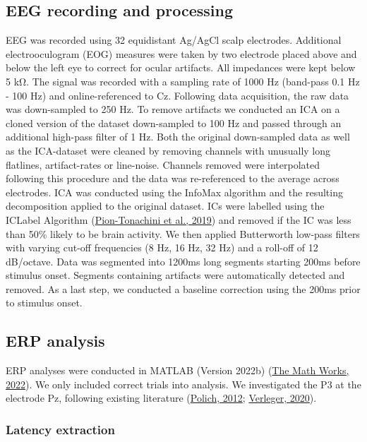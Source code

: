 \documentclass[
  man]{apa7}
\begin{document}
\hypertarget{eeg-recording-and-processing}{%
\subsection{EEG recording and processing}\label{eeg-recording-and-processing}}

EEG was recorded using 32 equidistant Ag/AgCl scalp electrodes. Additional electrooculogram (EOG) measures were taken by two electrode placed above and below the left eye to correct for ocular artifacts. All impedances were kept below 5 kΩ. The signal was recorded with a sampling rate of 1000 Hz (band-pass 0.1 Hz - 100 Hz) and online-referenced to Cz. Following data acquisition, the raw data was down-sampled to 250 Hz. To remove artifacts we conducted an ICA on a cloned version of the dataset down-sampled to 100 Hz and passed through an additional high-pass filter of 1 Hz. Both the original down-sampled data as well as the ICA-dataset were cleaned by removing channels with unusually long flatlines, artifact-rates or line-noise. Channels removed were interpolated following this procedure and the data was re-referenced to the average across electrodes. ICA was conducted using the InfoMax algorithm and the resulting decomposition applied to the original dataset. ICs were labelled using the ICLabel Algorithm (\protect\hyperlink{ref-pion2019iclabel}{Pion-Tonachini et al., 2019}) and removed if the IC was less than 50\% likely to be brain activity. We then applied Butterworth low-pass filters with varying cut-off frequencies (8 Hz, 16 Hz, 32 Hz) and a roll-off of 12 dB/octave. Data was segmented into 1200ms long segments starting 200ms before stimulus onset. Segments containing artifacts were automatically detected and removed. As a last step, we conducted a baseline correction using the 200ms prior to stimulus onset.

\hypertarget{erp-analysis}{%
\subsection{ERP analysis}\label{erp-analysis}}

ERP analyses were conducted in MATLAB (Version 2022b) (\protect\hyperlink{ref-matlab2022b}{The Math Works, 2022}). We only included correct trials into analysis. We investigated the P3 at the electrode Pz, following existing literature (\protect\hyperlink{ref-polich2012neuropsychology}{Polich, 2012}; \protect\hyperlink{ref-verleger2020effects}{Verleger, 2020}).

\hypertarget{latency-extraction}{%
\subsubsection{Latency extraction}\label{latency-extraction}}
\end{document}
